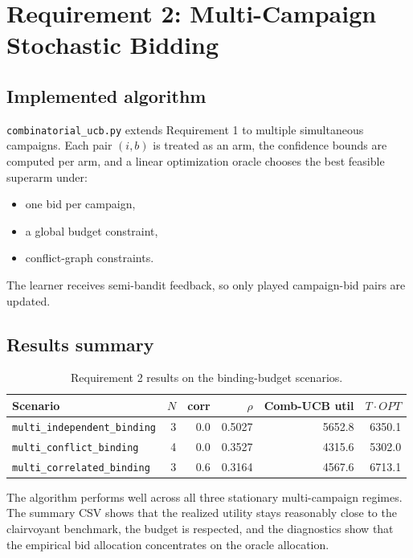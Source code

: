 \documentclass[11pt,a4paper]{article}
\begin{document}
\section{Requirement 2: Multi-Campaign Stochastic Bidding}

\subsection{Implemented algorithm}

\texttt{combinatorial\_ucb.py} extends Requirement 1 to multiple simultaneous
campaigns. Each pair $(i,b)$ is treated as an arm, the confidence bounds are
computed per arm, and a linear optimization oracle chooses the best feasible
superarm under:

\begin{itemize}
  \item one bid per campaign,
  \item a global budget constraint,
  \item conflict-graph constraints.
\end{itemize}

The learner receives semi-bandit feedback, so only played campaign-bid pairs are
updated.

\subsection{Results summary}

\begin{table}[H]
\centering
\small
\begin{tabular}{lrrrrr}
\toprule
Scenario & $N$ & corr & $\rho$ & Comb-UCB util & $T\cdot OPT$ \\
\midrule
\texttt{multi\_independent\_binding} & 3 & 0.0 & 0.5027 & 5652.8 & 6350.1 \\
\texttt{multi\_conflict\_binding} & 4 & 0.0 & 0.3527 & 4315.6 & 5302.0 \\
\texttt{multi\_correlated\_binding} & 3 & 0.6 & 0.3164 & 4567.6 & 6713.1 \\
\bottomrule
\end{tabular}
\caption{Requirement 2 results on the binding-budget scenarios.}
\end{table}

The algorithm performs well across all three stationary multi-campaign regimes.
The summary CSV shows that the realized utility stays reasonably close to the
clairvoyant benchmark, the budget is respected, and the diagnostics show that
the empirical bid allocation concentrates on the oracle allocation.
\end{document}

